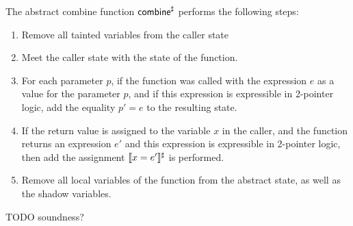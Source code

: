 The abstract combine function $\textsf{combine}^\sharp$ performs the following steps:
\begin{enumerate}
    \item Remove all tainted  variables from the caller state
    \item Meet the caller state with the state of the function.
    \item For each parameter $p$, if the function was called with the
    expression $e$ as a value for the parameter $p$, and if this expression is expressible in 2-pointer logic,
     add the equality $p' = e$ to the resulting state.
    \item If the return value is assigned to the variable $x$ in the caller,
    and the function returns an expression $e'$ and this expression is expressible in 2-pointer logic,
    then add the assignment $\llbracket x = e'\rrbracket^\sharp$ is performed.
    \item Remove all local variables of the function from the abstract state,
    as well as the shadow variables.
\end{enumerate}
TODO soundness?
